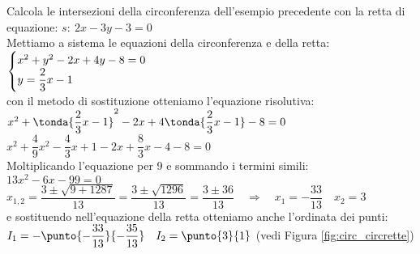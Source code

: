 \begin{esempio}
Calcola le intersezioni della circonferenza dell'esempio precedente con la 
retta di equazione: \(s:~2x -3y -3 = 0\)
\\[7pt]
Mettiamo a sistema le equazioni della circonferenza e della retta: \\[4pt]
\(\begin{cases}x^2 +y^2 -2x +4y -8 = 0 \\ y = \dfrac{2}{3}x -1\end{cases}\) 
\\[7pt]
con il metodo di sostituzione otteniamo l'equazione risolutiva: \\[4pt]
\(x^2 +\tonda{\dfrac{2}{3}x -1}^2 -2x +4\tonda{\dfrac{2}{3}x -1} -8 = 0\) \\[4pt]
\(x^2 +\dfrac{4}{9}x^2 - \dfrac{4}{3}x +1 -2x +\dfrac{8}{3}x -4 -8 = 0\) 
\\[7pt]
Moltiplicando l'equazione per 9 e sommando i termini simili:\\[4pt]
\(13x^2 -6x -99 = 0\) \\[4pt]
\(x_{1,2} = \dfrac{3 \pm \sqrt{9 +1287}}{13} = 
            \dfrac{3 \pm \sqrt{1296}}{13} = 
            \dfrac{3 \pm 36}{13} \quad \Rightarrow \quad x_1 = -\dfrac{33}{13} \quad x_2 = 3\) \\[7pt] 
e sostituendo nell'equazione della retta otteniamo anche l'ordinata dei 
punti: \\[4pt]
\(I_1 = - \punto{-\dfrac{33}{13}}{-\dfrac{35}{13}} \quad I_2 = \punto{3}{1}\)
\quad (vedi Figura \ref{fig:circ_circrette})

\end{esempio}

